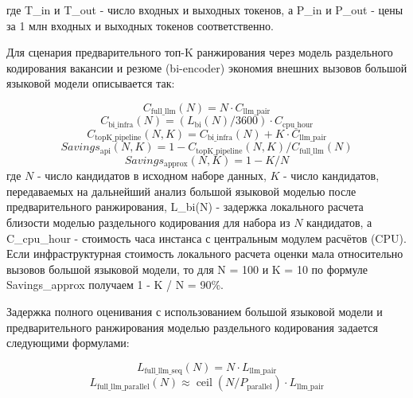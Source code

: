где T\_in и T\_out - число входных и выходных токенов, а P\_in и P\_out - цены за 1 млн входных и выходных токенов соответственно.\par
Для сценария предварительного топ-K ранжирования через модель раздельного кодирования вакансии и резюме (bi-encoder) экономия внешних вызовов большой языковой модели описывается так:\par
\begin{equation}
\label{eq:c_full_llm-7}
C_{\text{full\_llm}}(N) = N \cdot C_{\text{llm\_pair}}
\end{equation}
\begin{equation}
\label{eq:c_bi_infra-8}
C_{\text{bi\_infra}}(N) = (L_{\text{bi}}(N) / 3600) \cdot C_{\text{cpu\_hour}}
\end{equation}
\begin{equation}
\label{eq:c_topk_pipeline-9}
C_{\text{topK\_pipeline}}(N, K) = C_{\text{bi\_infra}}(N) + K \cdot C_{\text{llm\_pair}}
\end{equation}
\begin{equation}
\label{eq:savings_api-10}
Savings_{\text{api}}(N, K) = 1 - C_{\text{topK\_pipeline}}(N, K) / C_{\text{full\_llm}}(N)
\end{equation}
\begin{equation}
\label{eq:savings_approx-11}
Savings_{\text{approx}}(N, K) = 1 - K / N
\end{equation}
где $N$ - число кандидатов в исходном наборе данных, $K$ - число кандидатов, передаваемых на дальнейший анализ большой языковой моделью после предварительного ранжирования, L\_bi(N) - задержка локального расчета близости моделью раздельного кодирования для набора из $N$ кандидатов, а C\_cpu\_hour - стоимость часа инстанса с центральным модулем расчётов (CPU). Если инфраструктурная стоимость локального расчета оценки мала относительно вызовов большой языковой модели, то для N = 100 и K = 10 по формуле Savings\_approx получаем 1 - K / N = 90\%.\par
Задержка полного оценивания с использованием большой языковой модели и предварительного ранжирования моделью раздельного кодирования задается следующими формулами:\par
\begin{equation}
\label{eq:l_full_llm_seq-12}
L_{\text{full\_llm\_seq}}(N) = N \cdot L_{\text{llm\_pair}}
\end{equation}
\begin{equation}
\label{eq:l_full_llm_parallel-13}
L_{\text{full\_llm\_parallel}}(N) \approx  \operatorname{ceil}(N / P_{\text{parallel}}) \cdot L_{\text{llm\_pair}}
\end{equation}
